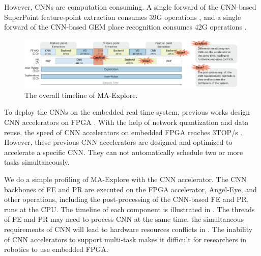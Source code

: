 However, CNNs are computation consuming. A single forward of the CNN-based SuperPoint \cite{detone2018superpoint} feature-point extraction consumes 39G operations \cite{detone2018superpoint}, and a single forward of the CNN-based GEM \cite{radenovic2018fine} place recognition consumes 42G operations \cite{radenovic2018fine}.


\begin{figure}[t]
    \centering
	\includegraphics[width=0.99\textwidth]{fig/overalltime.eps} 	
    \caption{
    The overall timeline of MA-Explore.
    }
	\label{fig:overalltime}
\end{figure}


To deploy the CNNs on the embedded real-time system, previous works design CNN accelerators on FPGA \cite{guo2017angel,yu2018instruction,li_high_2016,qiu2016going,lu_evaluating_2017}. With the help of network quantization and data reuse, the speed of CNN accelerators on embedded FPGA reaches 3TOP/s \cite{lu_evaluating_2017}.
However, these previous CNN accelerators are designed and optimized to accelerate a specific CNN. They can not automatically schedule two or more tasks simultaneously. 


We do a simple profiling of MA-Explore with the CNN accelerator. The CNN backbones of FE and  PR are executed on the FPGA accelerator, Angel-Eye\cite{guo2017angel}, and other operations, including the post-processing of the CNN-based FE and PR, runs at the CPU. The timeline of each component is illustrated in . 
The threads of FE and PR may need to process CNN at the same time, the simultaneous requirements of CNN will lead to hardware resources conflicts in . The inability of CNN accelerators to support multi-task makes it difficult for researchers in robotics to use embedded FPGA.

